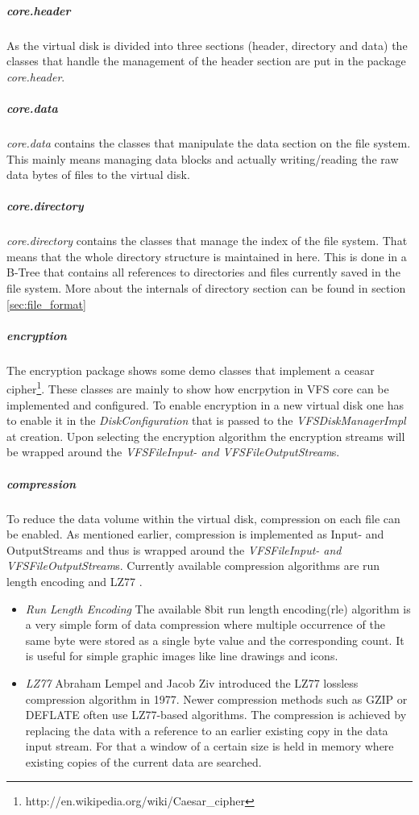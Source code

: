 \subparagraph{core.header}
As the virtual disk is divided into three sections (header, directory and data)
the classes that handle the management of the header section are put in the
package \textit{core.header}.
\subparagraph{core.data}
\textit{core.data} contains the classes that manipulate the data section on the
file system. This mainly means managing data blocks and actually writing/reading
the raw data bytes of files to the virtual disk.
\subparagraph{core.directory}
\textit{core.directory} contains the classes that manage the index of the file
system. That means that the whole directory structure is maintained in here.
This is done in a B-Tree that contains all references to directories and files
currently saved in the file system. More about the internals of directory
section can be found in section \ref{sec:file_format}

\subparagraph{encryption}
The encryption package shows some demo classes that implement a ceasar
cipher\footnote{http://en.wikipedia.org/wiki/Caesar\_cipher}. These classes are
mainly to show how encrpytion in VFS core can be implemented and configured. To
enable encryption in a new virtual disk one has to enable it in the
\textit{DiskConfiguration} that is passed to the \textit{VFSDiskManagerImpl} at
creation. Upon selecting the encryption algorithm the encryption streams will be
wrapped around the \textit{VFSFileInput- and VFSFileOutputStream}s.

\subparagraph{compression}

To reduce the data volume within the virtual disk, compression on each file can
be enabled. As mentioned earlier, compression is implemented as Input- and
OutputStreams and thus is wrapped around the \textit{VFSFileInput- and
VFSFileOutputStream}s. Currently available compression algorithms are run length
encoding \cite{rle} and LZ77 \cite{lz77}.

\begin{itemize}
  \item {\textit{Run Length Encoding}} The available 8bit run length
  encoding(rle) algorithm is a very simple form of data compression where
  multiple occurrence of the same byte were stored as a single byte value and
  the corresponding count. It is useful for simple graphic images like line
  drawings and icons.
  \item {\textit{LZ77}} Abraham Lempel and Jacob Ziv introduced the LZ77 lossless
  compression algorithm in 1977. Newer compression methods such as GZIP or DEFLATE often use LZ77-based
  algorithms. The compression is achieved by replacing the data with a reference
  to an earlier existing copy in the data input stream. For that a window of
  a certain size is held in memory where existing copies of the current data are
  searched.
\end{itemize}


